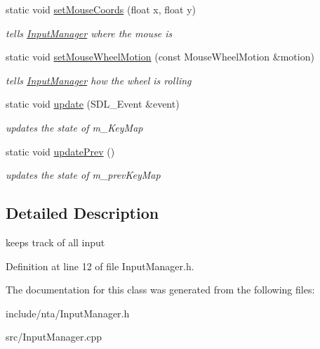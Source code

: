 \begin{DoxyCompactItemize}
\mbox{\label{classnta_1_1InputManager_a42590ba480b5fd5280cbc69732bb025f}} 
static void \hyperlink{classnta_1_1InputManager_a42590ba480b5fd5280cbc69732bb025f}{set\+Mouse\+Coords} (float x, float y)
\begin{DoxyCompactList}\small\item\em tells \hyperlink{classnta_1_1InputManager}{Input\+Manager} where the mouse is \end{DoxyCompactList}\item 
\mbox{\label{classnta_1_1InputManager_a716c722f10dfe636b79384087bbf1a6e}} 
static void \hyperlink{classnta_1_1InputManager_a716c722f10dfe636b79384087bbf1a6e}{set\+Mouse\+Wheel\+Motion} (const Mouse\+Wheel\+Motion \&motion)
\begin{DoxyCompactList}\small\item\em tells \hyperlink{classnta_1_1InputManager}{Input\+Manager} how the wheel is rolling \end{DoxyCompactList}\item 
\mbox{\label{classnta_1_1InputManager_a7c555e0a2ce37af042b5016140414f18}} 
static void \hyperlink{classnta_1_1InputManager_a7c555e0a2ce37af042b5016140414f18}{update} (S\+D\+L\+\_\+\+Event \&event)
\begin{DoxyCompactList}\small\item\em updates the state of m\+\_\+\+Key\+Map \end{DoxyCompactList}\item 
\mbox{\label{classnta_1_1InputManager_aea4219a830a2b1d9ee87bdc5f954903d}} 
static void \hyperlink{classnta_1_1InputManager_aea4219a830a2b1d9ee87bdc5f954903d}{update\+Prev} ()
\begin{DoxyCompactList}\small\item\em updates the state of m\+\_\+prev\+Key\+Map \end{DoxyCompactList}\end{DoxyCompactItemize}


\subsection{Detailed Description}
keeps track of all input 

Definition at line 12 of file Input\+Manager.\+h.



The documentation for this class was generated from the following files\+:\begin{DoxyCompactItemize}
\item 
include/nta/Input\+Manager.\+h\item 
src/Input\+Manager.\+cpp\end{DoxyCompactItemize}
